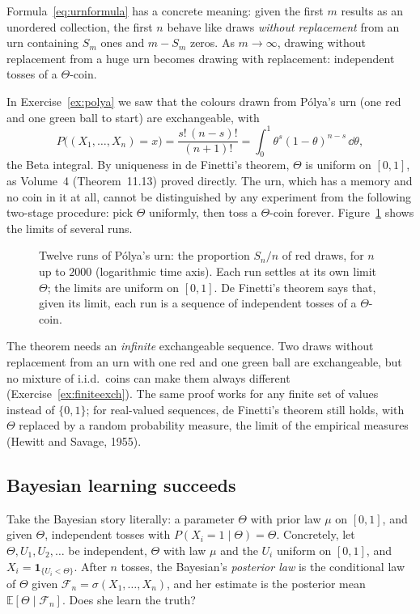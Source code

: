 Formula~\eqref{eq:urnformula} has a concrete meaning: given the first $m$ results as an unordered collection, the first $n$ behave like draws \emph{without replacement} from an urn containing $S_m$ ones and
$m-S_m$ zeros. As $m\to\infty$, drawing without replacement from a huge urn becomes drawing with replacement: independent tosses of a $\Theta$-coin.

\begin{example}\label{ex:polyadf}
In Exercise~\ref{ex:polya} we saw that the colours drawn from P\'olya's urn (one red and one green ball to start) are exchangeable, with
\[
P\bigl((X_1,\dots,X_n)=x\bigr)=\frac{s!\,(n-s)!}{(n+1)!}=\int_0^1\theta^s(1-\theta)^{n-s}\,\dd\theta,
\]
the Beta integral. By uniqueness in de Finetti's theorem, $\Theta$ is uniform on $[0,1]$, as Volume~4 (Theorem~11.13) proved directly. The urn, which has a memory and no coin in it at all, cannot be
distinguished by any experiment from the following two-stage procedure: pick $\Theta$ uniformly, then toss a $\Theta$-coin forever. Figure~\ref{fig:polyadf} shows the limits of several runs.
\end{example}

\begin{figure}[ht]
\centering{}
\caption{Twelve runs of P\'olya's urn: the proportion $S_n/n$ of red draws, for $n$ up to $2000$ (logarithmic time axis). Each run settles at its own limit $\Theta$; the limits are uniform on $[0,1]$. De Finetti's
theorem says that, given its limit, each run is a sequence of independent tosses of a $\Theta$-coin.}
\label{fig:polyadf}
\end{figure}

The theorem needs an \emph{infinite} exchangeable sequence. Two draws without replacement from an urn with one red and one green ball are exchangeable, but no mixture of i.i.d.\ coins can make
them always different (Exercise~\ref{ex:finiteexch}). The same proof works for any finite set of values instead of $\{0,1\}$; for real-valued sequences, de Finetti's theorem still holds, with $\Theta$ replaced by a random probability measure, the
limit of the empirical measures (Hewitt and Savage, 1955).

\subsection*{Bayesian learning succeeds}

Take the Bayesian story literally: a parameter $\Theta$ with prior law $\mu$ on $[0,1]$, and given $\Theta$, independent tosses with $P(X_i=1\mid\Theta)=\Theta$. Concretely, let $\Theta,U_1,U_2,\dots$ be independent,
$\Theta$ with law $\mu$ and the $U_i$ uniform on $[0,1]$, and $X_i=\mathbf 1_{\{U_i<\Theta\}}$. After $n$ tosses, the Bayesian's \emph{posterior law} is the conditional law of $\Theta$ given $\mathcal F_n=\sigma(X_1,\dots,X_n)$,
and her estimate is the posterior mean $\mathbb E[\Theta\mid\mathcal F_n]$. Does she learn the truth?

